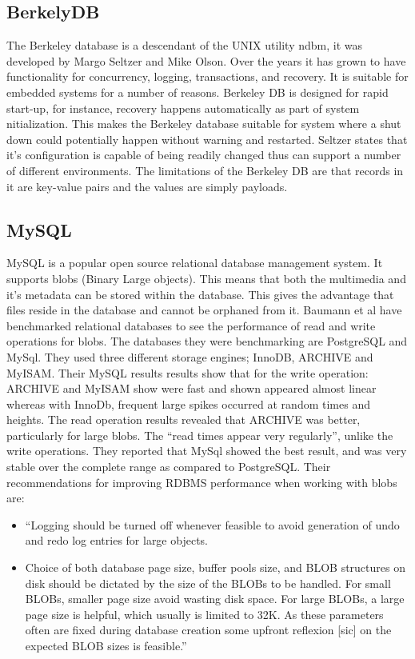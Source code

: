 \subsection{BerkelyDB}
The Berkeley database is a descendant of the UNIX utility ndbm, it was developed by Margo Seltzer and Mike Olson\cite{RefWorks:97}. Over the years it has grown to have functionality for concurrency, logging,
transactions, and recovery\cite{RefWorks:98}. It is suitable for embedded systems for a number of reasons. Berkeley DB is designed for rapid start-up, for instance, recovery happens automatically as part of system
nitialization. This makes the Berkeley database suitable for system where a shut down could potentially happen without warning and restarted\cite{RefWorks:98}. Seltzer\cite{RefWorks:99} states that it’s configuration
is capable of being readily changed thus can support a number of different environments. The limitations of the Berkeley DB are that records in it are key-value pairs and the values are simply payloads.

\subsection{MySQL}
MySQL is a popular open source relational database management system. It supports blobs (Binary Large objects). This means that both the multimedia and it's metadata can be stored within the database. This gives
the advantage that files reside in the database and cannot be orphaned from it. Baumann et al\cite{RefWorks:106}  have benchmarked relational databases to see the performance of read and write operations for blobs.
The databases they were benchmarking are PostgreSQL and MySql. They used three different storage engines; InnoDB, ARCHIVE and MyISAM. Their MySQL results results show that for the write operation: ARCHIVE and MyISAM
show were fast and shown appeared almost linear whereas with InnoDb, frequent large spikes occurred at random times and heights. The read operation results revealed that ARCHIVE was better, particularly for large blobs.
The ``read times appear very regularly''\cite{RefWorks:106}, unlike the write operations. They reported that MySql showed the best result, and was very stable over the complete range as compared to PostgreSQL.
Their recommendations for improving RDBMS performance when working with blobs are:


\begin{itemize}
\item ``Logging should be turned off whenever feasible to avoid
generation of undo and redo log entries for large objects.
\item Choice of both database page size, buffer pools size, and BLOB structures on disk should be dictated by the size of the BLOBs to be handled. For small BLOBs, smaller page size avoid wasting disk space. For
large BLOBs, a large page size is helpful, which usually is limited to 32K. As these parameters often are fixed during database creation some upfront reflexion [sic] on the expected BLOB sizes is feasible.''
\end{itemize}


